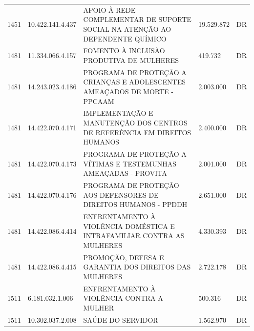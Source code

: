 \documentclass{article}
\begin{document}
\begin{longtable}[c]{m{1cm}|m{2cm}|m{10cm}|m{2cm}|m{1cm}}
\multicolumn{1}{C{1cm}|}{1451} & \multicolumn{1}{C{2cm}|}{10.422.141.4.437} & \multicolumn{1}{L{10cm}|}{APOIO À REDE COMPLEMENTAR DE SUPORTE SOCIAL NA ATENÇÃO AO DEPENDENTE QUÍMICO} & \multicolumn{1}{R{2cm}|}{19.529.872} & \multicolumn{1}{C{1cm}}{DR} \\
\multicolumn{1}{C{1cm}|}{1481} & \multicolumn{1}{C{2cm}|}{11.334.066.4.157} & \multicolumn{1}{L{10cm}|}{FOMENTO À INCLUSÃO PRODUTIVA DE MULHERES} & \multicolumn{1}{R{2cm}|}{419.732} & \multicolumn{1}{C{1cm}}{DR} \\
\multicolumn{1}{C{1cm}|}{1481} & \multicolumn{1}{C{2cm}|}{14.243.023.4.186} & \multicolumn{1}{L{10cm}|}{PROGRAMA DE PROTEÇÃO A CRIANÇAS E ADOLESCENTES AMEAÇADOS DE MORTE - PPCAAM} & \multicolumn{1}{R{2cm}|}{2.003.000} & \multicolumn{1}{C{1cm}}{DR} \\
\multicolumn{1}{C{1cm}|}{1481} & \multicolumn{1}{C{2cm}|}{14.422.070.4.171} & \multicolumn{1}{L{10cm}|}{IMPLEMENTAÇÃO E MANUTENÇÃO DOS CENTROS DE REFERÊNCIA EM DIREITOS HUMANOS} & \multicolumn{1}{R{2cm}|}{2.400.000} & \multicolumn{1}{C{1cm}}{DR} \\
\multicolumn{1}{C{1cm}|}{1481} & \multicolumn{1}{C{2cm}|}{14.422.070.4.173} & \multicolumn{1}{L{10cm}|}{PROGRAMA DE PROTEÇÃO A VÍTIMAS E TESTEMUNHAS AMEAÇADAS - PROVITA} & \multicolumn{1}{R{2cm}|}{2.001.000} & \multicolumn{1}{C{1cm}}{DR} \\
\multicolumn{1}{C{1cm}|}{1481} & \multicolumn{1}{C{2cm}|}{14.422.070.4.176} & \multicolumn{1}{L{10cm}|}{PROGRAMA DE PROTEÇÃO AOS DEFENSORES DE DIREITOS HUMANOS - PPDDH} & \multicolumn{1}{R{2cm}|}{2.651.000} & \multicolumn{1}{C{1cm}}{DR} \\
\multicolumn{1}{C{1cm}|}{1481} & \multicolumn{1}{C{2cm}|}{14.422.086.4.414} & \multicolumn{1}{L{10cm}|}{ENFRENTAMENTO À VIOLÊNCIA DOMÉSTICA E INTRAFAMILIAR CONTRA AS MULHERES} & \multicolumn{1}{R{2cm}|}{4.330.393} & \multicolumn{1}{C{1cm}}{DR} \\
\multicolumn{1}{C{1cm}|}{1481} & \multicolumn{1}{C{2cm}|}{14.422.086.4.415} & \multicolumn{1}{L{10cm}|}{PROMOÇÃO, DEFESA E GARANTIA DOS DIREITOS DAS MULHERES} & \multicolumn{1}{R{2cm}|}{2.722.178} & \multicolumn{1}{C{1cm}}{DR} \\
\multicolumn{1}{C{1cm}|}{1511} & \multicolumn{1}{C{2cm}|}{6.181.032.1.006} & \multicolumn{1}{L{10cm}|}{ENFRENTAMENTO À VIOLÊNCIA CONTRA A MULHER} & \multicolumn{1}{R{2cm}|}{500.316} & \multicolumn{1}{C{1cm}}{DR} \\
\multicolumn{1}{C{1cm}|}{1511} & \multicolumn{1}{C{2cm}|}{10.302.037.2.008} & \multicolumn{1}{L{10cm}|}{SAÚDE DO SERVIDOR} & \multicolumn{1}{R{2cm}|}{1.562.970} & \multicolumn{1}{C{1cm}}{DR} \\

\end{longtable}
\end{document}
